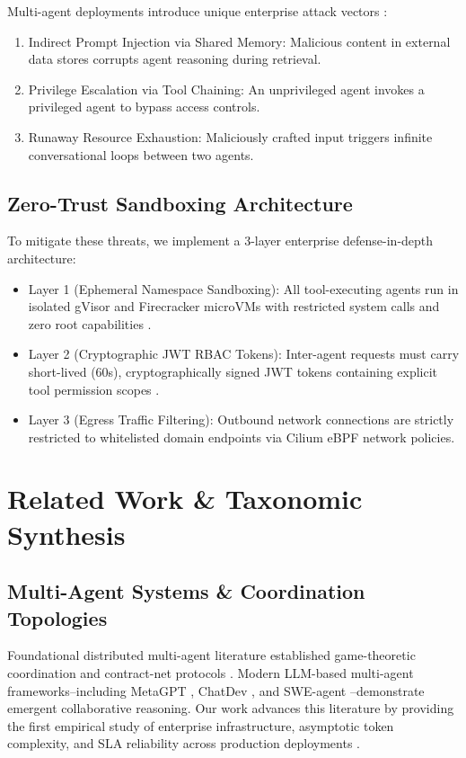 \documentclass[10pt,twocolumn,letterpaper]{article}
\begin{document}
Multi-agent deployments introduce unique enterprise attack vectors \cite{arxiv_2404_04289}:
\begin{enumerate}
  \item Indirect Prompt Injection via Shared Memory: Malicious content in external data stores corrupts agent reasoning during retrieval.
  \item Privilege Escalation via Tool Chaining: An unprivileged agent invokes a privileged agent to bypass access controls.
  \item Runaway Resource Exhaustion: Maliciously crafted input triggers infinite conversational loops between two agents.
\end{enumerate}


\subsection{Zero-Trust Sandboxing Architecture}


To mitigate these threats, we implement a 3-layer enterprise defense-in-depth architecture:
\begin{itemize}
  \item Layer 1 (Ephemeral Namespace Sandboxing): All tool-executing agents run in isolated gVisor and Firecracker microVMs with restricted system calls and zero root capabilities \cite{doaj_001772c2113c476d9d5d40452c8e10e1}.
  \item Layer 2 (Cryptographic JWT RBAC Tokens): Inter-agent requests must carry short-lived (60s), cryptographically signed JWT tokens containing explicit tool permission scopes \cite{pubmed_42380865}.
  \item Layer 3 (Egress Traffic Filtering): Outbound network connections are strictly restricted to whitelisted domain endpoints via Cilium eBPF network policies.
\end{itemize}




\section{Related Work \& Taxonomic Synthesis}



\subsection{Multi-Agent Systems \& Coordination Topologies}

Foundational distributed multi-agent literature established game-theoretic coordination and contract-net protocols \cite{arxiv_2203_08975,arxiv_2010_11146}. Modern LLM-based multi-agent frameworks--including MetaGPT \cite{crossref_10_48550_arxiv_2308_00352}, ChatDev \cite{crossref_10_18653_v1_2024_acl_long_810}, and SWE-agent \cite{crossref_10_48550_arxiv_2405_15793}--demonstrate emergent collaborative reasoning. Our work advances this literature by providing the first empirical study of enterprise infrastructure, asymptotic token complexity, and SLA reliability across production deployments \cite{crossref_10_1201_9788743808145_14}.
\end{document}
